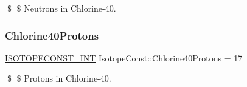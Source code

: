 \$ \$ Neutrons in Chlorine-\/40. \mbox{\label{group___isotope_const-_chlorine-_cl40_ga99c8cb860a5a3206a0b2f1aaf3ba19d9}} 
\subsubsection{\texorpdfstring{Chlorine40\+Protons}{Chlorine40Protons}}
{\footnotesize\ttfamily \mbox{\hyperlink{group___isotope_const-_macros_ga5f18360b3e99483a35c32d789e62621c}{I\+S\+O\+T\+O\+P\+E\+C\+O\+N\+S\+T\+\_\+\+I\+NT}} Isotope\+Const\+::\+Chlorine40\+Protons = 17}

\$ \$ Protons in Chlorine-\/40. 